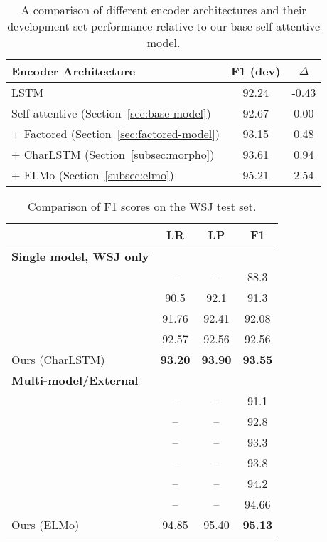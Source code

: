 \documentclass[11pt,a4paper]{article}
\begin{document}
\begin{table}[t!]
\begin{center}
\begin{tabular}{@{}lcc@{}}
\toprule
Encoder Architecture & F1 (dev) & $\Delta$ \\
\midrule
LSTM \citep{gaddy_analysis_2018} & 92.24 & -0.43 \\
Self-attentive (Section~\ref{sec:base-model}) & 92.67 & \phantom{-}0.00 \\
+ Factored (Section~\ref{sec:factored-model}) & 93.15 & \phantom{-}0.48\\
+ CharLSTM (Section~\ref{subsec:morpho}) & 93.61 & \phantom{-}0.94\\
+ ELMo (Section~\ref{subsec:elmo}) & 95.21 & \phantom{-}2.54\\
\bottomrule
\end{tabular}
\end{center}
\caption{\label{table:wsj-recap} A comparison of different encoder architectures and their development-set performance relative to our base self-attentive model.}
\end{table}

\begin{table}[t!]
\begin{center}
\begin{tabular}{@{}lccc@{}}
\toprule
& LR & LP & F1  \\
\midrule
\textbf{Single model, WSJ only\hspace{-1em}} \\
\addlinespace
\citet{vinyals_grammar_2015} & -- & -- & 88.3\phantom{0} \\
\citet{cross_span-based_2016} & 90.5\phantom{0} & 92.1\phantom{0}  & 91.3\phantom{0} \\
\citet{gaddy_analysis_2018} & 91.76 & 92.41 & 92.08 \\
\citet{stern_effective_2017} & 92.57 & 92.56 & 92.56 \\
Ours (CharLSTM) & \textbf{93.20} &\textbf{93.90} & \textbf{93.55} \\
\addlinespace
\textbf{Multi-model/External} \\
\addlinespace
\citet{durrett_neural_2015} & -- & -- & 91.1\phantom{0} \\
\citet{vinyals_grammar_2015} & -- & -- & 92.8\phantom{0} \\
\citet{dyer_recurrent_2016} & -- & -- & 93.3\phantom{0} \\
\citet{choe_parsing_2016}\hspace{-1em} & -- & -- & 93.8\phantom{0} \\
\citet{liu_in_order_2017} & -- & -- & 94.2\phantom{0} \\
\citet{fried_improving_2017} & -- & -- & 94.66 \\
Ours (ELMo) & 94.85 & 95.40 & \textbf{95.13} \\
\bottomrule
\end{tabular}
\end{center}
\caption{\label{table:wsj-test} Comparison of F1 scores on the WSJ test set.}
\end{table}
\end{document}
